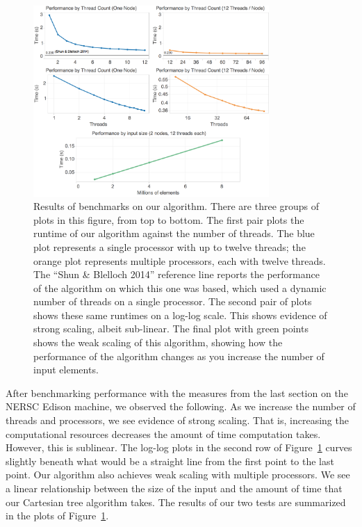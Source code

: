 \documentclass[10pt]{article}
\begin{document}
\begin{figure}[t]
\centering
\includegraphics[width=0.8\textwidth]{figures/benchmarks}
\caption{%
Results of benchmarks on our algorithm.
There are three groups of plots in this figure, from top to bottom.
The first pair plots the runtime of our algorithm against the number of threads.
The blue plot represents a single processor with up to twelve threads;
the orange plot represents multiple processors, each with twelve threads.
The ``Shun \& Blelloch 2014'' reference line reports the performance of the algorithm on which
this one was based, which used a dynamic number of threads on a single processor.
The second pair of plots shows these same runtimes on a log-log scale.
This shows evidence of strong scaling, albeit sub-linear.
The final plot with green points shows the weak scaling of this algorithm, showing how the
performance of the algorithm changes as you increase the number of input elements.
}
\label{fig:benchmarks}
\end{figure}

After benchmarking performance with the measures from the last section on the NERSC Edison machine,
we observed the following.
As we increase the number of threads and processors, we see evidence of strong scaling.
That is, increasing the computational resources decreases the amount of time computation takes.
However, this is sublinear.
The log-log plots in the second row of Figure~\ref{fig:benchmarks} curves slightly beneath what
would be a straight line from the first point to the last point.
Our algorithm also achieves weak scaling with multiple processors.
We see a linear relationship between the size of the input and the amount of time that our
Cartesian tree algorithm takes.
The results of our two tests are summarized in the plots of Figure~\ref{fig:benchmarks}.
\end{document}
